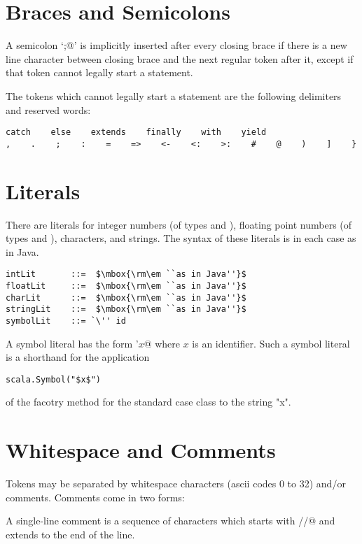 \documentclass[a4paper,12pt,twoside,titlepage]{book}
\begin{document}
\section{Braces and Semicolons}

A semicolon `\lstinline@;@' is implicitly inserted after every closing brace
if there is a new line character between closing brace and the next
regular token after it, except if that token cannot legally start a
statement.

The tokens which cannot legally start a statement
are the following delimiters and reserved words:
\begin{lstlisting}
catch    else    extends    finally    with    yield
,    .    ;    :    =    =>    <-    <:    >:    #    @    )    ]    }
\end{lstlisting}

\section{Literals}

There are literals for integer numbers (of types  and ),
floating point numbers (of types  and ), characters, and
strings.  The syntax of these literals is in each case as in Java.

\syntax\begin{lstlisting}
intLit       ::=  $\mbox{\rm\em ``as in Java''}$
floatLit     ::=  $\mbox{\rm\em ``as in Java''}$
charLit      ::=  $\mbox{\rm\em ``as in Java''}$
stringLit    ::=  $\mbox{\rm\em ``as in Java''}$
symbolLit    ::= `\'' id
\end{lstlisting}

A symbol literal has the form \lstinline@'$x$@ where $x$ is an identifier.
Such a symbol literal is a  shorthand for the application
\begin{lstlisting}
scala.Symbol("$x$")
\end{lstlisting}
of the facotry method for the standard case class  to the string "x".

\section{Whitespace and Comments}

Tokens may be separated by whitespace characters (ascii codes 0 to 32)
and/or comments. Comments come in two forms:

A single-line comment is a sequence of characters which starts with
\lstinline@//@ and extends to the end of the line.
\end{document}

